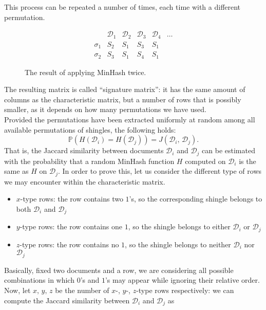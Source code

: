 \documentclass{article}
\begin{document}
  This process can be repeated a number of times, each time with a different
  permutation.
  \begin{figure}[H]
    \[
      \begin{array}{l|lllll}
        & \mathcal D_1 & \mathcal D_2 & \mathcal D_3 & \mathcal D_4 & \dots \\
        \hline
        \sigma_1 & S_2 & S_1 & S_3 & S_1 & \\
        \sigma_2 & S_3 & S_1 & S_4 & S_1 &
      \end{array}
    \]
    \caption*{The result of applying MinHash twice.}
  \end{figure}
  The resulting matrix is called “signature matrix”: it has the same amount of
  columns as the characteristic matrix, but a number of rows that is possibly
  smaller, as it depends on how many permutations we have used. \\
  Provided the permutations have been extracted uniformly at random among all
  available permutations of shingles, the following holds:
  \[
    \mathbb P ( H ( \mathcal D_i ) = H ( \mathcal D_j ) ) =
    J ( \mathcal D_i, \, \mathcal D_j ) \mathrm .
  \]
  That is, the Jaccard similarity between documents \( \mathcal D_i \) and
  \( \mathcal D_j \) can be estimated with the probability that a random
  MinHash function \( H \) computed on \( \mathcal D_i \) is the same as
  \( H \) on \( \mathcal D_j \). In order to prove this, let us consider the
  different type of rows we may encounter within the characteristic matrix.
  \begin{itemize}
    \item \( x \)-type rows: the row contains two \( 1 \)'s, so the
    corresponding shingle belongs to both \( \mathcal D_i \) and
    \( \mathcal D_j \)
    \item \( y \)-type rows: the row contains one \( 1 \), so the shingle
    belongs to either \( \mathcal D_i \) or \( \mathcal D_j \)
    \item \( z \)-type rows: the row contains no \( 1 \), so the shingle
    belongs to neither \( \mathcal D_i \) nor \( \mathcal D_j \)
  \end{itemize}
  Basically, fixed two documents and a row, we are considering all possible
  combinations in which \( 0 \)'s and \( 1 \)'s may appear while ignoring their
  relative order. \\
  Now, let \( x, \, y, \, z \) be the number of \( x \)-, \( y \)-,
  \( z \)-type rows respectively: we can compute the Jaccard similarity between
  \( \mathcal D_i \) and \( \mathcal D_j \) as
\end{document}
